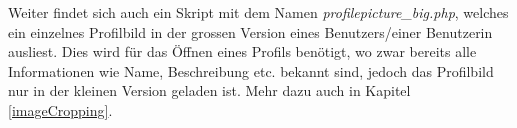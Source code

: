\documentclass[../main.tex]{subfiles}
\begin{document}
	 Weiter findet sich auch ein Skript mit dem Namen \emph{profilepicture\_big.php}, welches ein einzelnes Profilbild  in der grossen Version eines Benutzers/einer Benutzerin ausliest. Dies wird für das Öffnen eines Profils benötigt, wo zwar bereits alle Informationen wie Name, Beschreibung etc. bekannt sind, jedoch das Profilbild nur in der kleinen Version geladen ist. Mehr dazu auch in Kapitel \ref{imageCropping}.
\end{document}
